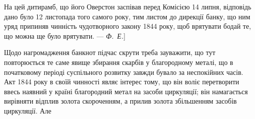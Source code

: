 На цей дитирамб, що його Оверстон заспівав перед Комісією 14 липня,
відповідь дано було 12 листопада того самого року, тим листом до дирекції
банку, що ним уряд припиняв чинність чудотворного закону 1844 року, щоб
врятувати бодай те, що можна ще було врятувати. — \emph{Ф.~Е.}]


Щодо нагромадження банкнот підчас скрути треба зауважити, що тут повторюється
те саме явище збирання скарбів у благородному металі, що в початковому
періоді суспільного розвитку завжди бувало за неспокійних часів. Акт
1844 року в своїй чинності являє інтерес тому, що він воліє перетворити ввесь
наявний у країні благородний метал на засоби циркуляції; він намагається вирівняти
відплив золота скороченням, а прилив золота збільшенням засобів циркуляції. Але
\parbreak{}  %
